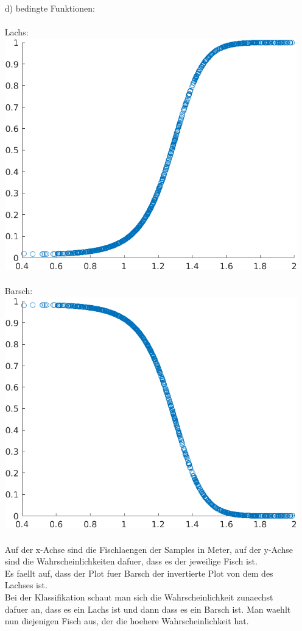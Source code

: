 \documentclass[a4paper]{scrartcl}
\begin{document}
\begin{itemize}
		\item[d)] bedingte Funktionen:\\\\
		Lachs:\\
		\includegraphics*[scale=0.5]{assignment2_data/plots/cond_function_salmon.png}\\ \ \\
		Barsch:\\
		\includegraphics*[scale=0.5]{assignment2_data/plots/cond_function_seabass.png}\\ \ \\
		Auf der x-Achse sind die Fischlaengen der Samples in Meter, auf der y-Achse sind die Wahrscheinlichkeiten dafuer, dass es der jeweilige Fisch ist.\\
		Es faellt auf, dass der Plot fuer Barsch der invertierte Plot von dem des Lachses ist.\\
		Bei der Klassifikation schaut man sich die Wahrscheinlichkeit zunaechst dafuer an, dass es ein Lachs ist und dann dass es ein Barsch ist. Man waehlt nun diejenigen Fisch aus, der die hoehere Wahrscheinlichkeit hat.\\ 
		

\end{itemize}
\end{document}
